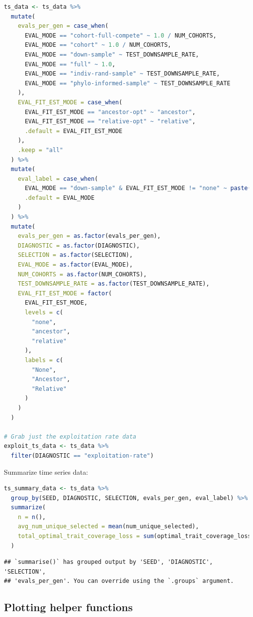 \documentclass[
]{book}
\begin{document}
\begin{lstlisting}[language=R]
ts_data <- ts_data %>%
  mutate(
    evals_per_gen = case_when(
      EVAL_MODE == "cohort-full-compete" ~ 1.0 / NUM_COHORTS,
      EVAL_MODE == "cohort" ~ 1.0 / NUM_COHORTS,
      EVAL_MODE == "down-sample" ~ TEST_DOWNSAMPLE_RATE,
      EVAL_MODE == "full" ~ 1.0,
      EVAL_MODE == "indiv-rand-sample" ~ TEST_DOWNSAMPLE_RATE,
      EVAL_MODE == "phylo-informed-sample" ~ TEST_DOWNSAMPLE_RATE
    ),
    EVAL_FIT_EST_MODE = case_when(
      EVAL_FIT_EST_MODE == "ancestor-opt" ~ "ancestor",
      EVAL_FIT_EST_MODE == "relative-opt" ~ "relative",
      .default = EVAL_FIT_EST_MODE
    ),
    .keep = "all"
  ) %>%
  mutate(
    eval_label = case_when(
      EVAL_MODE == "down-sample" & EVAL_FIT_EST_MODE != "none" ~ paste("down-sample", EVAL_FIT_EST_MODE, sep="-"),
      .default = EVAL_MODE
    )
  ) %>%
  mutate(
    evals_per_gen = as.factor(evals_per_gen),
    DIAGNOSTIC = as.factor(DIAGNOSTIC),
    SELECTION = as.factor(SELECTION),
    EVAL_MODE = as.factor(EVAL_MODE),
    NUM_COHORTS = as.factor(NUM_COHORTS),
    TEST_DOWNSAMPLE_RATE = as.factor(TEST_DOWNSAMPLE_RATE),
    EVAL_FIT_EST_MODE = factor(
      EVAL_FIT_EST_MODE,
      levels = c(
        "none",
        "ancestor",
        "relative"
      ),
      labels = c(
        "None",
        "Ancestor",
        "Relative"
      )
    )
  )

# Grab just the exploitation rate data
exploit_ts_data <- ts_data %>%
  filter(DIAGNOSTIC == "exploitation-rate")
\end{lstlisting}

Summarize time series data:

\begin{lstlisting}[language=R]
ts_summary_data <- ts_data %>%
  group_by(SEED, DIAGNOSTIC, SELECTION, evals_per_gen, eval_label) %>%
  summarize(
    n = n(),
    avg_num_unique_selected = mean(num_unique_selected),
    total_optimal_trait_coverage_loss = sum(optimal_trait_coverage_loss)
  )
\end{lstlisting}

\begin{lstlisting}
## `summarise()` has grouped output by 'SEED', 'DIAGNOSTIC', 'SELECTION',
## 'evals_per_gen'. You can override using the `.groups` argument.
\end{lstlisting}

\hypertarget{plotting-helper-functions}{%
\subsection{Plotting helper functions}\label{plotting-helper-functions}}
\end{document}
